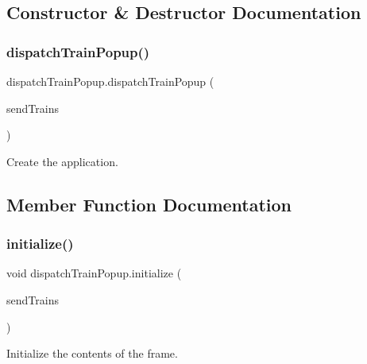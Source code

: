 \subsection{Constructor \& Destructor Documentation}
\mbox{\label{classdispatchTrainPopup_a993dfedab3089cef6ac33cdee08eb336}} 
\subsubsection{\texorpdfstring{dispatch\+Train\+Popup()}{dispatchTrainPopup()}}
{\footnotesize\ttfamily dispatch\+Train\+Popup.\+dispatch\+Train\+Popup (\begin{DoxyParamCaption}\item[{Array\+List$<$ \hyperlink{classtrain}{train} $>$}]{send\+Trains }\end{DoxyParamCaption})}



Create the application. 



\subsection{Member Function Documentation}
\mbox{\label{classdispatchTrainPopup_abd0cc81d2cf2f62041d0907ec073f54a}} 
\subsubsection{\texorpdfstring{initialize()}{initialize()}}
{\footnotesize\ttfamily void dispatch\+Train\+Popup.\+initialize (\begin{DoxyParamCaption}\item[{Array\+List$<$ \hyperlink{classtrain}{train} $>$}]{send\+Trains }\end{DoxyParamCaption})\hspace{0.3cm}{\ttfamily [private]}}



Initialize the contents of the frame. 

\mbox{\label{classdispatchTrainPopup_a339856eed3f163cacde0a351981f1829}} 
